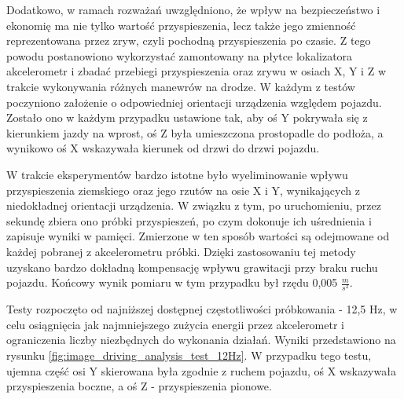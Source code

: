Dodatkowo, w ramach rozważań uwzględniono, że wpływ na bezpieczeństwo i ekonomię ma nie tylko wartość przyspieszenia, lecz także jego zmienność reprezentowana przez zryw, czyli pochodną przyspieszenia po czasie. Z tego powodu postanowiono wykorzystać zamontowany na płytce lokalizatora akcelerometr i zbadać przebiegi przyspieszenia oraz zrywu w osiach X, Y i Z w trakcie wykonywania różnych manewrów na drodze. W każdym z testów poczyniono założenie o odpowiedniej orientacji urządzenia względem pojazdu. Zostało ono w każdym przypadku ustawione tak, aby oś Y pokrywała się z kierunkiem jazdy na wprost, oś Z była umieszczona prostopadle do podłoża, a wynikowo oś X wskazywała kierunek od drzwi do drzwi pojazdu.

W trakcie eksperymentów bardzo istotne było wyeliminowanie wpływu przyspieszenia ziemskiego oraz jego rzutów na osie X i Y, wynikających z niedokładnej orientacji urządzenia. W związku z tym, po uruchomieniu, przez sekundę zbiera ono próbki przyspieszeń, po czym dokonuje ich uśrednienia i zapisuje wyniki w pamięci. Zmierzone w ten sposób wartości są odejmowane od każdej pobranej z akcelerometru próbki. Dzięki zastosowaniu tej metody uzyskano bardzo dokładną kompensację wpływu grawitacji przy braku ruchu pojazdu. Końcowy wynik pomiaru w tym przypadku był rzędu 0,005 $\frac{m}{s^2}$.

Testy rozpoczęto od najniższej dostępnej częstotliwości próbkowania - 12,5 Hz, w celu osiągnięcia jak najmniejszego zużycia energii przez akcelerometr i ograniczenia liczby niezbędnych do wykonania działań. Wyniki przedstawiono na rysunku \ref{fig:image_driving_analysis_test_12Hz}. W przypadku tego testu, ujemna część osi Y skierowana była zgodnie z ruchem pojazdu, oś X wskazywała przyspieszenia boczne, a oś Z - przyspieszenia pionowe.


